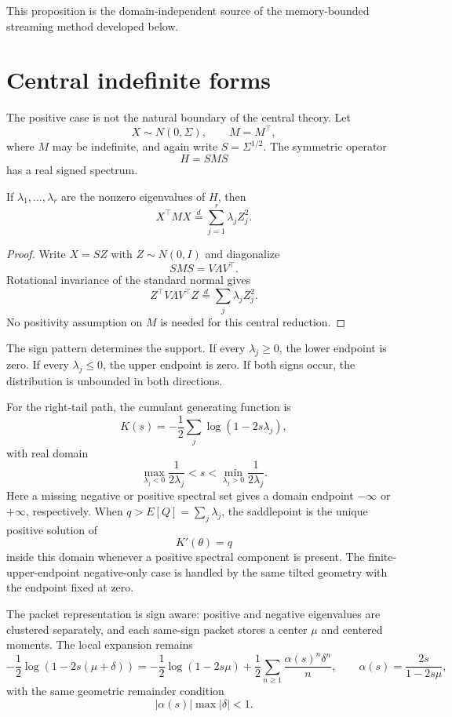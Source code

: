 This proposition is the domain-independent source of the memory-bounded
streaming method developed below.

\section{Central indefinite forms}

The positive case is not the natural boundary of the central theory.  Let
\[
X\sim N(0,\Sigma),
\qquad
M=M^\top,
\]
where $M$ may be indefinite, and again write $S=\Sigma^{1/2}$.  The symmetric
operator
\[
H=SMS
\]
has a real signed spectrum.

\begin{theorem}\label{claim:final-2-2}
If $\lambda_1,\ldots,\lambda_r$ are the nonzero eigenvalues of $H$, then
\[
\boxed{
X^\top M X
\overset d=
\sum_{j=1}^r\lambda_jZ_j^2.
}
\]
\end{theorem}

\begin{proof}
Write $X=SZ$ with $Z\sim N(0,I)$ and diagonalize
\[
SMS=V\Lambda V^\top.
\]
Rotational invariance of the standard normal gives
\[
Z^\top V\Lambda V^\top Z
\overset d=
\sum_j\lambda_jZ_j^2.
\]
No positivity assumption on $M$ is needed for this central reduction.
\end{proof}

The sign pattern determines the support.  If every $\lambda_j\ge0$, the lower
endpoint is zero.  If every $\lambda_j\le0$, the upper endpoint is zero.  If
both signs occur, the distribution is unbounded in both directions.

For the right-tail path, the cumulant generating function is
\[
K(s)
=
-\frac12\sum_j\log(1-2s\lambda_j),
\]
with real domain
\[
\boxed{
\max_{\lambda_j<0}\frac{1}{2\lambda_j}
< s <
\min_{\lambda_j>0}\frac{1}{2\lambda_j}.
}
\]
Here a missing negative or positive spectral set gives a domain endpoint
\(-\infty\) or \(+\infty\), respectively.
When $q>E[Q]=\sum_j\lambda_j$, the saddlepoint is the unique positive solution
of
\[
K'(\theta)=q
\]
inside this domain whenever a positive spectral component is present.  The
finite-upper-endpoint negative-only case is handled by the same tilted
geometry with the endpoint fixed at zero.

The packet representation is sign aware: positive and negative eigenvalues are
clustered separately, and each same-sign packet stores a center $\mu$ and
centered moments.  The local expansion remains
\[
-\frac12\log(1-2s(\mu+\delta))
=
-\frac12\log(1-2s\mu)
+
\frac12\sum_{n\ge1}
\frac{\alpha(s)^n\delta^n}{n},
\qquad
\alpha(s)=\frac{2s}{1-2s\mu},
\]
with the same geometric remainder condition
\[
|\alpha(s)|\max|\delta|<1.
\]

